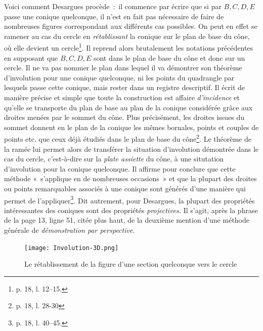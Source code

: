 \documentclass[12pt, a4paper]{article}
\begin{document}
Voici comment Desargues procède~:~il commence par écrire que si par $B,C,D,E$ passe une conique quelconque, il n'est en fait pas nécessaire de faire de nombreuses figures correspondant aux différents cas possibles. On peut en effet se ramener au cas du cercle en \textit{rétablissant} la conique sur le plan de base du c\^one, où elle devient un cercle\footnote{p. 18, l. 12--15.}. Il reprend alors brutalement les notations précédentes en supposant que $B,C,D,E$ sont dans le plan de base du cône et donc sur un cercle. Il ne va pas nommer le plan dans lequel il va démontrer son théorème d'involution pour une conique quelconque, ni les points du quadrangle par lesquels passe cette conique, mais rester dans un registre descriptif. Il écrit de manière précise et simple que toute la construction est affaire \textit{d'incidence} et qu'elle se transporte du plan de base au plan de la conique considérée grâce aux droites menées par le sommet du cône. Plus précisément, les droites issues du sommet donnent en le plan de la conique les mêmes bornales,  points et couples de points etc. que ceux déjà étudiés dans le plan de base du cône\footnote{p. 18, l. 28-30}. Le théorème de la ramée lui permet alors de transférer la situation d'involution démontrée dans le cas du cercle, c'est-à-dire sur la \textit{plate assiette} du cône, à une situtation d'involution pour la conique quelconque. Il affirme pour conclure que cette méthode «~s'applique en de nombreuses occasions~» et que la plupart des droites ou points remarquables associés à une conique sont générés d'une manière qui permet de l'appliquer\footnote{p. 18, l. 40--45.}. Dit autrement, pour Desargues, la plupart des propriétés intéressantes des coniques sont des propriétés \textit{projectives.} Il s'agit, après la phrase de la page 13, ligne 51, citée plus haut, de la deuxième mention d'une méthode générale de \textit{démonstration par perspective.}

\begin{figure}[!ht] %
\centering
\texttt{[image: Involution-3D.png]}
\caption{Le rétablissement de la figure d'une section quelconque vers le cercle}
\label{Cone-3D}
\end{figure}
\end{document}
